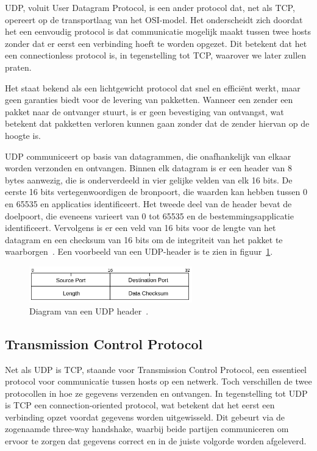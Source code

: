 UDP, voluit User Datagram Protocol, is een ander protocol dat, net als TCP, opereert op de transportlaag van het OSI-model.
Het onderscheidt zich doordat het een eenvoudig protocol is dat communicatie mogelijk maakt tussen twee hosts zonder dat er eerst een verbinding hoeft te worden opgezet.
Dit betekent dat het een connectionless protocol is, in tegenstelling tot TCP, waarover we later zullen praten.

Het staat bekend als een lichtgewicht protocol dat snel en effici\"ent werkt, maar geen garanties biedt voor de levering van pakketten.
Wanneer een zender een pakket naar de ontvanger stuurt, is er geen bevestiging van ontvangst, wat betekent dat pakketten verloren kunnen gaan zonder dat de zender hiervan op de hoogte is.

UDP communiceert op basis van datagrammen, die onafhankelijk van elkaar worden verzonden en ontvangen.
Binnen elk datagram is er een header van 8 bytes aanwezig, die is onderverdeeld in vier gelijke velden van elk 16 bits.
De eerste 16 bits vertegenwoordigen de bronpoort, die waarden kan hebben tussen 0 en 65535 en applicaties identificeert.
Het tweede deel van de header bevat de doelpoort, die eveneens varieert van 0 tot 65535 en de bestemmingsapplicatie identificeert.
Vervolgens is er een veld van 16 bits voor de lengte van het datagram en een checksum van 16 bits om de integriteit van het pakket te waarborgen~\autocite{dordal2020}.
Een voorbeeld van een UDP-header is te zien in figuur~\ref{fig:netwerk-udp-header}.

\begin{figure}[h!]
    \begin{center}
        \includegraphics[width=200pt]
        {./graphics/network/udp-header.png}
        \caption{\label{fig:netwerk-udp-header}Diagram van een UDP header~\autocite{dordal2020}.}
    \end{center}
\end{figure}

\subsection{Transmission Control Protocol}
\label{netwerk_tcp}

Net als UDP is TCP, staande voor Transmission Control Protocol, een essentieel protocol voor communicatie tussen hosts op een netwerk.
Toch verschillen de twee protocollen in hoe ze gegevens verzenden en ontvangen.
In tegenstelling tot UDP is TCP een connection-oriented protocol, wat betekent dat het eerst een verbinding opzet voordat gegevens worden uitgewisseld.
Dit gebeurt via de zogenaamde three-way handshake, waarbij beide partijen communiceren om ervoor te zorgen dat gegevens correct en in de juiste volgorde worden afgeleverd.

